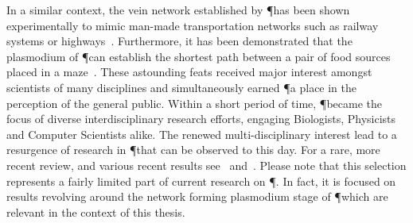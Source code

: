 		In a similar context, the vein network established by \P has been shown experimentally to mimic man-made transportation networks such as railway systems or highways~\cite{tero2010rules,tero2006physarum,nakagaki2004smart}. Furthermore, it has been demonstrated that the plasmodium of \P can establish the shortest path between a pair of food sources placed in a maze~\cite{nakagaki2000intelligence}. These astounding feats received major interest amongst scientists of many disciplines and simultaneously earned \P a place in the perception of the general public. Within a short period of time, \P became the focus of diverse interdisciplinary research efforts, engaging Biologists, Physicists and Computer Scientists alike. The renewed multi-disciplinary interest lead to a resurgence of research in \P that can be observed to this day. For a rare, more recent review, and various recent results see~\cite{ueda2005intelligent} and~\cite{takamatsu2009environment,shirakawa2007emergence,alim2013random,Tero2007553,nakagaki2004obtaining}. Please note that this selection represents a fairly limited part of current research on \P. In fact, it is focused on results revolving around the network forming plasmodium stage of \P which are relevant in the context of this thesis.

		\FloatBarrier
